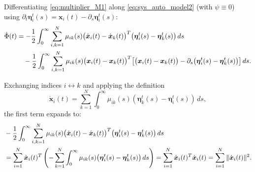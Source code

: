 \documentclass[11pt]{amsart}
\numberwithin{equation}{section}
\begin{document}
Differentiating \eqref{eq:multiplier_M1} along \eqref{eq:sys_auto_model2} (with $\psi \equiv 0$) using $\partial_t \boldsymbol{\eta}_i^t(s) = \boldsymbol{x}_i(t) - \partial_s \boldsymbol{\eta}_i^t(s)$:
\begin{align}\label{eq:Phi_dot_split}
\dot{\Phi}(t) &= -\frac{1}{2}\int_0^\infty\sum_{i,k=1}^N\mu_{ik}(s)\big(\dot{\boldsymbol{x}}_i(t)-\dot{\boldsymbol{x}}_k(t)\big)^T\big(\boldsymbol{\eta}_i^t(s)-\boldsymbol{\eta}_k^t(s)\big)\,ds \notag \\
&\quad - \frac{1}{2}\int_0^\infty\sum_{i,k=1}^N\mu_{ik}(s)\big(\boldsymbol{x}_i(t)-\boldsymbol{x}_k(t)\big)^T\big[\big(\boldsymbol{x}_i(t)-\boldsymbol{x}_k(t)\big) - \partial_s\big(\boldsymbol{\eta}_i^t(s)-\boldsymbol{\eta}_k^t(s)\big)\big]\,ds.
\end{align}

Exchanging indices $i \leftrightarrow k$ and applying the definition
$$
\dot{\boldsymbol{x}}_i(t) = \sum_{k=1}^N \int_0^\infty \mu_{ik}(s)(\boldsymbol{\eta}_k^t(s)-\boldsymbol{\eta}_i^t(s))\,ds,
$$
the first term expands to:
{\small
\begin{align}\label{eq:Phi_term1}
&-\frac{1}{2}\int_0^\infty\sum_{i,k=1}^N \mu_{ik}(s)\big(\dot{\boldsymbol{x}}_i(t)-\dot{\boldsymbol{x}}_k(t)\big)^T\big(\boldsymbol{\eta}_i^t(s)-\boldsymbol{\eta}_k^t(s)\big)\,ds \notag \\
&= \sum_{i=1}^N \dot{\boldsymbol{x}}_i(t)^T \left( -\sum_{k=1}^N \int_0^\infty \mu_{ik}(s)\big(\boldsymbol{\eta}_i^t(s)-\boldsymbol{\eta}_k^t(s)\big)\,ds \right) = \sum_{i=1}^N \dot{\boldsymbol{x}}_i(t)^T \dot{\boldsymbol{x}}_i(t) = \sum_{i=1}^N \|\dot{\boldsymbol{x}}_i(t)\|^2.
\end{align}
}
\end{document}
